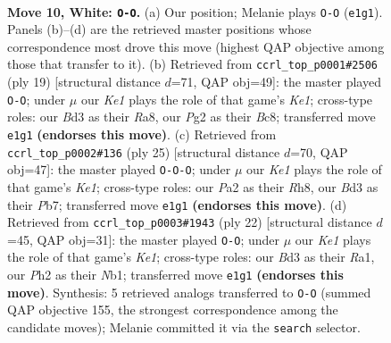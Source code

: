\documentclass[11pt]{article}
\begin{document}
\clearpage

\begin{figure}[p]\centering
\begin{subfigure}{0.46\textwidth}\centering
\resizebox{\linewidth}{!}{%
\newchessgame
\chessboard[
  setfen={rnbqr1k1/pp3ppp/3b1n2/3pp1B1/3P4/3B1N2/PPP2PPP/RN1QK2R w KQ - 0 10},
  showmover=false,
  pgfstyle=straightmove, color=movearrow, markmove={e1-g1}
]}
\caption{}
\end{subfigure}\hfill
\begin{subfigure}{0.46\textwidth}\centering
\resizebox{\linewidth}{!}{%
\newchessgame
\chessboard[
  setfen={r1bqk2r/1p3ppp/p1n2n2/2bp2B1/8/P4NP1/1PP2PBP/RN1Q1RK1 b kq - 1 10},
  showmover=false,
  pgfstyle=straightmove, color=movearrow, markmove={e8-g8}
]}
\caption{}
\end{subfigure}
\\[4pt]
\begin{subfigure}{0.46\textwidth}\centering
\resizebox{\linewidth}{!}{%
\newchessgame
\chessboard[
  setfen={r3k2r/1pq2ppp/p1nb1n2/3P2B1/6b1/1BN5/PPP1N1PP/R2QK2R b KQkq - 4 13},
  showmover=false,
  pgfstyle=straightmove, color=movearrow, markmove={e8-c8}
]}
\caption{}
\end{subfigure}\hfill
\begin{subfigure}{0.46\textwidth}\centering
\resizebox{\linewidth}{!}{%
\newchessgame
\chessboard[
  setfen={rnbq1rk1/1p2npp1/p2b3p/3p4/3P3B/1PPB1N2/5PPP/RN1QK2R w KQ - 2 12},
  showmover=false,
  pgfstyle=straightmove, color=movearrow, markmove={e1-g1}
]}
\caption{}
\end{subfigure}
\caption{\textbf{Move 10, White: \texttt{O-O}.} (a) Our position; Melanie plays \texttt{O-O} (\texttt{e1g1}). Panels (b)--(d) are the retrieved master positions whose correspondence most drove this move (highest QAP objective among those that transfer to it). (b) Retrieved from \texttt{ccrl\_top\_p0001\#2506} (ply 19) [structural distance $d$=71, QAP obj=49]: the master played \texttt{O-O}; under $\mu$ our \emph{Ke1} plays the role of that game's \emph{Ke1}; cross-type roles: our \emph{B}d3 as their \emph{R}a8, our \emph{P}g2 as their \emph{B}c8; transferred move \texttt{e1g1} \textbf{(endorses this move)}. (c) Retrieved from \texttt{ccrl\_top\_p0002\#136} (ply 25) [structural distance $d$=70, QAP obj=47]: the master played \texttt{O-O-O}; under $\mu$ our \emph{Ke1} plays the role of that game's \emph{Ke1}; cross-type roles: our \emph{P}a2 as their \emph{R}h8, our \emph{B}d3 as their \emph{P}b7; transferred move \texttt{e1g1} \textbf{(endorses this move)}. (d) Retrieved from \texttt{ccrl\_top\_p0003\#1943} (ply 22) [structural distance $d$=45, QAP obj=31]: the master played \texttt{O-O}; under $\mu$ our \emph{Ke1} plays the role of that game's \emph{Ke1}; cross-type roles: our \emph{B}d3 as their \emph{R}a1, our \emph{P}h2 as their \emph{N}b1; transferred move \texttt{e1g1} \textbf{(endorses this move)}. Synthesis: 5 retrieved analogs transferred to \texttt{O-O} (summed QAP objective 155, the strongest correspondence among the candidate moves); Melanie committed it via the \texttt{search} selector.}
\label{fig:thought-m18}
\end{figure}
\end{document}
